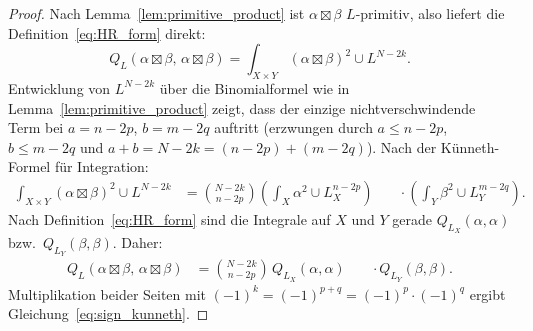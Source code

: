 \documentclass[aps,prd,twocolumn,superscriptaddress,nofootinbib]{revtex4-2}
\theoremstyle{definition}
\theoremstyle{remark}
\def\\{ }%
\begin{document}
\begin{proof}
Nach Lemma~\ref{lem:primitive_product} ist $\alpha \boxtimes \beta$ $L$-primitiv, also liefert die Definition~\eqref{eq:HR_form} direkt:
\[
Q_L(\alpha \boxtimes \beta,\, \alpha \boxtimes \beta) = \int_{X \times Y} (\alpha \boxtimes \beta)^2 \cup L^{N-2k}.
\]
Entwicklung von $L^{N-2k}$ über die Binomialformel wie in Lemma~\ref{lem:primitive_product} zeigt, dass der einzige nichtverschwindende Term bei $a = n - 2p$, $b = m - 2q$ auftritt (erzwungen durch $a \leq n-2p$, $b \leq m-2q$ und $a + b = N - 2k = (n-2p) + (m-2q)$). Nach der Künneth-Formel für Integration:
\[
\begin{aligned}
\int_{X \times Y}(\alpha \boxtimes \beta)^2 \cup L^{N-2k}
&= \binom{N-2k}{n-2p}
   \left(\int_X \alpha^2 \cup L_X^{n-2p}\right)\\
&\quad\cdot
   \left(\int_Y \beta^2 \cup L_Y^{m-2q}\right).
\end{aligned}
\]
Nach Definition~\eqref{eq:HR_form} sind die Integrale auf $X$ und $Y$ gerade $Q_{L_X}(\alpha, \alpha)$ bzw.\ $Q_{L_Y}(\beta, \beta)$. Daher:
\[
\begin{aligned}
Q_L(\alpha \boxtimes \beta,\, \alpha \boxtimes \beta)
&= \binom{N-2k}{n-2p}\,
   Q_{L_X}(\alpha, \alpha)\\
&\quad\cdot Q_{L_Y}(\beta, \beta).
\end{aligned}
\]
Multiplikation beider Seiten mit $(-1)^k = (-1)^{p+q} = (-1)^p \cdot (-1)^q$ ergibt Gleichung~\eqref{eq:sign_kunneth}.
\end{proof}
\end{document}
